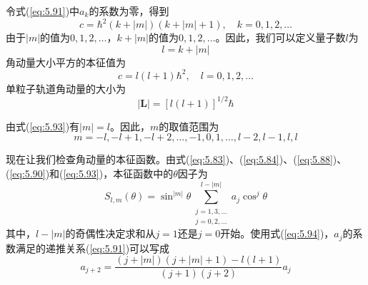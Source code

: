     令式(\ref{eq:5.91})中$a_k$的系数为零，得到
    \begin{equation}
        c = \hbar^2\left(k+\left|m\right|\right)\left(k+\left|m\right|+1\right), \quad k = 0, 1, 2, \ldots
        \label{eq:5.92}
    \end{equation}
    由于$\left|m\right|$的值为$0, 1, 2, \ldots$，$k+\left|m\right|$的值为$0, 1, 2, \ldots$。因此，我们可以定义量子数$l$为
    \begin{equation}
        l = k + \left|m\right|
        \label{eq:5.93}
    \end{equation}
    角动量大小平方的本征值为
    \begin{equation}
        c = l\left(l+1\right)\hbar^2, \quad l = 0, 1, 2, \ldots
        \label{eq:5.94}
    \end{equation}
    单粒子轨道角动量的大小为
    \begin{equation}
        \left|\mathbf{L}\right| = \left[l\left(l+1\right)\right]^{1/2}\hbar
        \label{eq:5.95}
    \end{equation}

    由式(\ref{eq:5.93})有$\left|m\right| = l$。因此，$m$的取值范围为
    \begin{equation}
        m = -l, -l+1, -l+2, \ldots, -1, 0, 1, \ldots, l-2, l-1, l, l
        \label{eq:5.96}
    \end{equation}

    现在让我们检查角动量的本征函数。由式(\ref{eq:5.83})、(\ref{eq:5.84})、(\ref{eq:5.88})、(\ref{eq:5.90})和(\ref{eq:5.93})，本征函数中的$\theta$因子为
    \begin{equation}
        S_{l,m}\left(\theta\right) = \sin^{\left|m\right|}\theta\sum_{\substack{j=1,3,\ldots \\ j=0,2,\ldots}}^{l-\left|m\right|}a_j\cos^j\theta
        \label{eq:5.97}
    \end{equation}
    其中，$l-\left|m\right|$的奇偶性决定求和从$j=1$还是$j=0$开始。使用式(\ref{eq:5.94})，$a_j$的系数满足的递推关系(\ref{eq:5.91})可以写成
    \begin{equation}
        a_{j+2} = \frac{\left(j+\left|m\right|\right)\left(j+\left|m\right|+1\right)-l\left(l+1\right)}{\left(j+1\right)\left(j+2\right)}a_j
        \label{eq:5.98}
    \end{equation}

